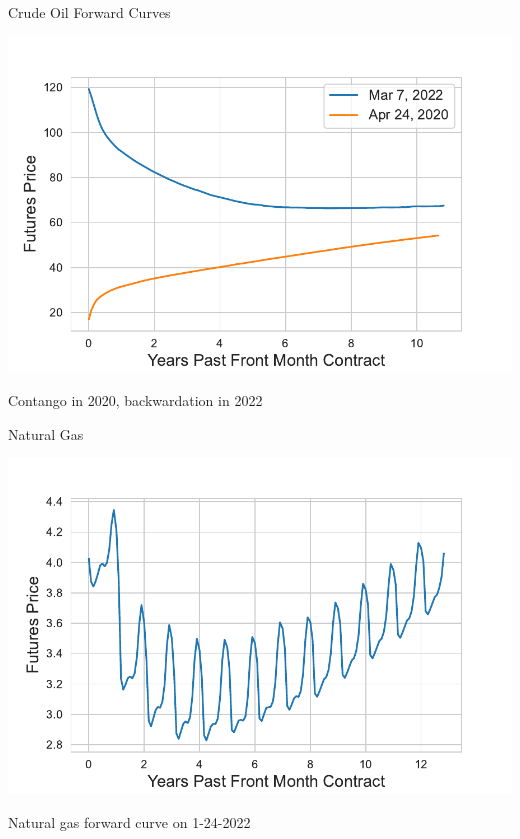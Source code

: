 \documentclass[xcolor=dvipsnames,10pt]{beamer}
\begin{document}
\begin{frame}{Crude Oil Forward Curves}
    \begin{center}
        \includegraphics[scale=0.6]{Images/fig_crude.pdf}
    \end{center}
    Contango in 2020, backwardation in 2022
\end{frame}

\begin{frame}{Natural Gas}
    \begin{center}
        \includegraphics[scale=0.6]{Images/fig_ng.pdf}
    \end{center}
    Natural gas forward curve on 1-24-2022
\end{frame}
\end{document}
